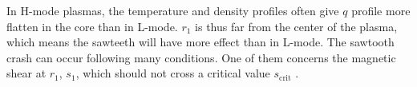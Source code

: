 In H-mode plasmas, the temperature and density profiles often give $q$ profile more flatten in the core than in L-mode. $r_1$ is thus far from the center of the plasma, which means the sawteeth will have more effect than in L-mode. The sawtooth crash can occur following many conditions. One of them concerns the magnetic shear at $r_1$, $s_1$, which should not cross a critical value $s_{\textrm{crit}}$ \cite{porcelli1996}.
